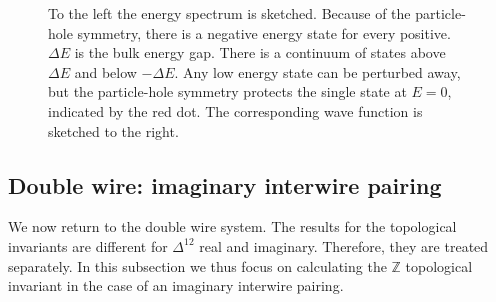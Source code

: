 \begin{figure}
\center
{}
\caption{To the left the energy spectrum is sketched. Because of the particle-hole symmetry, there is a negative energy state for every positive. $\Delta E$ is the bulk energy gap. There is a continuum of states above $\Delta E$ and below $-\Delta E$. Any low energy state can be perturbed away, but the particle-hole symmetry protects the single state at $E = 0$, indicated by the red dot. The corresponding wave function is sketched to the right.}
\label{fig.edgestates}
\end{figure}

\subsection{Double wire: imaginary interwire pairing} \label{subsec.2wires_CSinv_Delta12imag}
We now return to the double wire system. The results for the topological invariants are different for $\Delta^{12}$ real and imaginary. Therefore, they are treated separately. In this subsection we thus focus on calculating the $\mathbb{Z}$ topological invariant in the case of an imaginary interwire pairing. 

